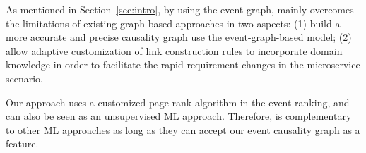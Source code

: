 
As mentioned in Section~\ref{sec:intro}, by using the event graph, \system mainly overcomes the limitations of existing graph-based approaches in two aspects: (1) build a more accurate and precise causality graph use the event-graph-based model; (2) allow adaptive customization of link construction rules to incorporate domain knowledge in order to facilitate the rapid requirement changes in the microservice scenario.

Our \system approach uses a customized page rank algorithm in the event ranking, and can also be seen as an unsupervised ML approach. Therefore, \system is complementary to other ML approaches as long as they can accept our event causality graph as a feature.

